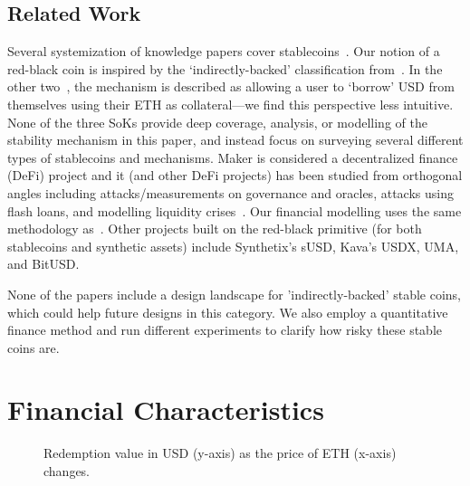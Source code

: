 \subsection{Related Work} Several systemization of knowledge papers cover stablecoins~\cite{PHP+19,MSS20,CDM20}. Our notion of a red-black coin is inspired by the `indirectly-backed' classification from~\cite{CDM20}. In the other two~\cite{PHP+19,MSS20}, the mechanism is described as allowing a user to `borrow' USD from themselves using their ETH as collateral---we find this perspective less intuitive. None of the three SoKs provide deep coverage, analysis, or modelling of the stability mechanism in this paper, and instead focus on surveying several different types of stablecoins and mechanisms. Maker is considered a decentralized finance (DeFi) project and it (and other DeFi projects) has been studied from orthogonal angles including attacks/measurements on governance and oracles, attacks using flash loans, and modelling liquidity crises~\cite{GRB20,GPH+20,QZLG20,KMM20}. Our financial modelling uses the same methodology as~\cite{GPH+20}. Other projects built on the red-black primitive (for both stablecoins and synthetic assets) include Synthetix's sUSD, Kava's USDX, UMA, and BitUSD. 

None of the papers include a design landscape for 'indirectly-backed' stable coins, which could help future designs in this category. We also employ a quantitative finance method and run different experiments to clarify how risky these stable coins are. 


\section{Financial Characteristics}


\begin{figure}[t]
    \centering
        \qquad
    \caption{Redemption value in USD (y-axis) as the price of ETH (x-axis) changes. \label{fig:price1} \label{fig:price2}}
\end{figure}


